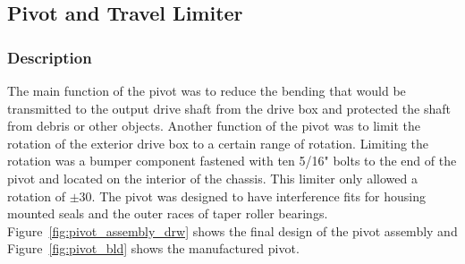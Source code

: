 \subsection{Pivot and Travel Limiter}
\subsubsection{Description}
The main function of the pivot was to reduce the bending that would be transmitted to the output drive shaft from the drive box and protected the shaft from debris or other objects. Another function of the pivot was to limit the rotation of the exterior drive box to a certain range of rotation. Limiting the rotation was a bumper component fastened with ten 5/16" bolts to the end of the pivot and located on the interior of the chassis. This limiter only allowed a rotation of $\pm$30\degree. The pivot was designed to have interference fits for housing mounted seals and the outer races of taper roller bearings. Figure~\ref{fig:pivot_assembly_drw} shows the final design of the pivot assembly and Figure~\ref{fig:pivot_bld} shows the manufactured pivot.
